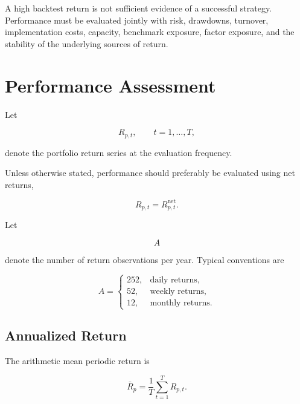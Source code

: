 \documentclass[11pt,a4paper]{article}
\begin{document}
A high backtest return is not sufficient evidence of a successful strategy.
Performance must be evaluated jointly with risk, drawdowns, turnover,
implementation costs, capacity, benchmark exposure, factor exposure, and the
stability of the underlying sources of return.


\section{Performance Assessment}
\label{sec:performance_assessment}

Let

\begin{equation}
R_{p,t},
\qquad
t=1,\ldots,T,
\end{equation}

denote the portfolio return series at the evaluation frequency.

Unless otherwise stated, performance should preferably be evaluated using net
returns,

\begin{equation}
R_{p,t}
=
R_{p,t}^{\mathrm{net}}.
\end{equation}

Let

\begin{equation}
A
\end{equation}

denote the number of return observations per year. Typical conventions are

\begin{equation}
A=
\begin{cases}
252, & \text{daily returns},\\
52, & \text{weekly returns},\\
12, & \text{monthly returns}.
\end{cases}
\end{equation}


\subsection{Annualized Return}

The arithmetic mean periodic return is

\begin{equation}
\bar{R}_p
=
\frac{1}{T}
\sum_{t=1}^{T}
R_{p,t}.
\end{equation}
\end{document}
